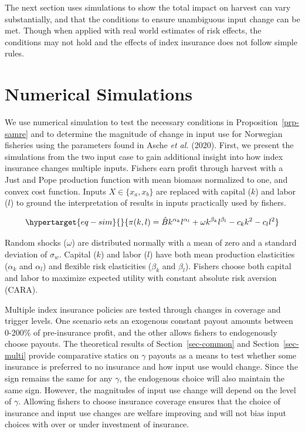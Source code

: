 \documentclass[
  letterpaper,
  DIV=11,
  numbers=noendperiod]{scrartcl}
\theoremstyle{plain}
\theoremstyle{plain}
\theoremstyle{remark}
\begin{document}
The next section uses simulations to show the total impact on harvest
can vary substantially, and that the conditions to ensure unambiguous
input change can be met. Though when applied with real world estimates
of risk effects, the conditions may not hold and the effects of index
insurance does not follow simple rules.

\hypertarget{sec-sim}{%
\section{Numerical Simulations}\label{sec-sim}}

We use numerical simulation to test the necessary conditions in
Proposition~\ref{prp-samre} and to determine the magnitude of change in
input use for Norwegian fisheries using the parameters found in Asche
\emph{et al.} (2020). First, we present the simulations from the two
input case to gain additional insight into how index insurance changes
multiple inputs. Fishers earn profit through harvest with a Just and
Pope production function with mean biomass normalized to one, and convex
cost function. Inputs \(X \in \{x_a,x_b\}\) are replaced with capital
(\(k\)) and labor (\(l\)) to ground the interpretation of results in
inputs practically used by fishers.

\begin{equation}\protect\hypertarget{eq-sim}{}{
\pi(k,l)=\hat{B}k^{\alpha_k}l^{\alpha_l}+\omega k^{\beta_k}l^{\beta_l}-c_kk^2-c_ll^2
}\label{eq-sim}\end{equation}

Random shocks (\(\omega\)) are distributed normally with a mean of zero
and a standard deviation of \(\sigma_w\). Capital (\(k\)) and labor
(\(l\)) have both mean production elasticities (\(\alpha_k\) and
\(\alpha_l\)) and flexible risk elasticities (\(\beta_k\) and
\(\beta_l\)). Fishers choose both capital and labor to maximize expected
utility with constant absolute risk aversion (CARA).

Multiple index insurance policies are tested through changes in coverage
and trigger levels. One scenario sets an exogenous constant payout
amounts between 0-200\% of pre-insurance profit, and the other allows
fishers to endogenously choose payouts. The theoretical results of
Section~\ref{sec-common} and Section~\ref{sec-multi} provide comparative
statics on \(\gamma\) payouts as a means to test whether some insurance
is preferred to no insurance and how input use would change. Since the
sign remains the same for any \(\gamma\), the endogenous choice will
also maintain the same sign. However, the magnitudes of input use change
will depend on the level of \(\gamma\). Allowing fishers to choose
insurance coverage ensures that the choice of insurance and input use
changes are welfare improving and will not bias input choices with over
or under investment of insurance.
\end{document}
